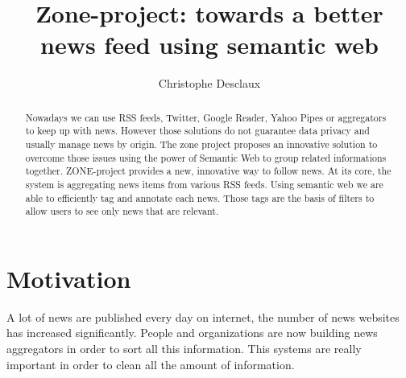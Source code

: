 \documentclass{llncs}
\begin{document}
%
\frontmatter          %
%
\pagestyle{headings}  %
%

\mainmatter              %
%
\title{Zone-project: towards a better news feed using semantic web}
%
%
\author{Christophe Desclaux}
%
%
%

\maketitle

\begin{abstract}%
Nowadays we can use RSS feeds, Twitter, Google Reader, Yahoo Pipes or aggregators to keep up with news. However those solutions do not guarantee data privacy and usually manage news by origin. 
The zone project proposes an innovative solution to overcome those issues using the power of Semantic Web to group related informations together.
ZONE-project provides a new, innovative way to follow news. 
At its core, the system is aggregating news items from various RSS feeds.
Using semantic web we are able to efficiently tag and annotate each news. 
Those tags are the basis of filters to allow users to see only news that are relevant.


{}
\end{abstract}
%
\section{Motivation}
%
A lot of news are published every day on internet, the number of news websites has increased significantly. People and organizations are now building news aggregators in order to sort all this information. This systems are really important in order to clean all the amount of information.
\end{document}
